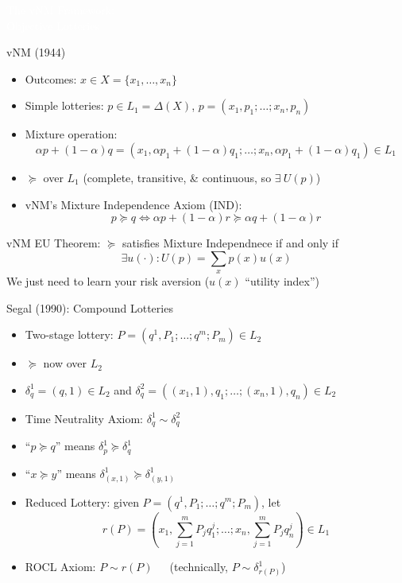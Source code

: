 \begin{transitionframe}[c]
  \begin{center}{ \Huge \textcolor{white}{The vNM Framework:\\Objective Lotteries}}\end{center}
\end{transitionframe}

\begin{frame}{vNM (1944)}
\begin{itemize}
    \item Outcomes: $x\in X = \{x_1,\ldots,x_n\}$
    \item Simple lotteries: $p\in L_1=\Delta(X)$, $p=(x_1,p_1;\ldots;x_n,p_n)$
    \item Mixture operation: 
    $$\alpha p + (1-\alpha) q = (x_1,\alpha p_1 + (1-\alpha) q_1;\ldots;x_n,\alpha p_1 + (1-\alpha)q_1) \in L_1 $$
    \item $\succeq$ over $L_1$ (complete, transitive, \& continuous, so $\exists \ U(p)$)
    \item vNM's Mixture Independence Axiom (IND):
    $$
     p\succeq q \iff \alpha p + (1-\alpha) r \succeq \alpha q + (1-\alpha) r
    $$
\end{itemize}
\br
vNM EU Theorem: $\succeq$ satisfies Mixture Independnece if and only if
$$
   \exists u(\cdot) : U(p) = \sum_x p(x)u(x)
$$
We just need to learn your risk aversion ($u(x)$ ``utility index'')
\end{frame}

\begin{frame}{Segal (1990): Compound Lotteries}
\begin{itemize}
    \item Two-stage lottery: $P=(q^1,P_1;\ldots;q^m;P_m)\in L_2$
    \item $\succeq$ now over $L_2$
    \item $\delta^1_q = (q,1)\in L_2$ and $\delta^2_q = ((x_1,1),q_1;\ldots;(x_n,1),q_n)\in L_2$
    \item Time Neutrality Axiom: $\delta^1_q \sim \delta^2_q$
    \item ``$p\succeq q$'' means $\delta^1_p \succeq \delta^1_q$
    \item ``$x\succeq y$'' means $\delta^1_{(x,1)}\succeq \delta^1_{(y,1)}$
    \item Reduced Lottery: given $P=(q^1,P_1;\ldots;q^m;P_m)$, let
    $$
        r(P) = \left( x_1,\sum_{j=1}^m P_jq^j_1;\ldots;x_n,\sum_{j=1}^m P_jq^j_n \right) \in L_1
    $$
    \item ROCL Axiom: $P \sim r(P)$\ \ \  (technically, $P\sim \delta^1_{r(P)}$)
\end{itemize}
\end{frame}

